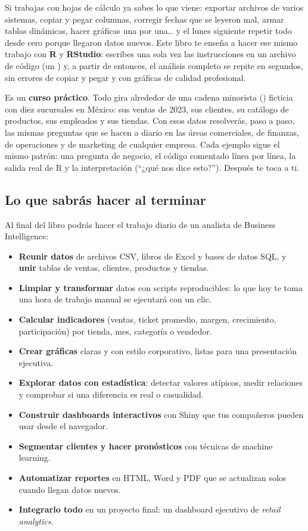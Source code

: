 Si trabajas con hojas de cálculo ya sabes lo que viene: exportar archivos de
varios sistemas, copiar y pegar columnas, corregir fechas que se leyeron mal,
armar tablas dinámicas, hacer gráficas una por una\ldots{} y el lunes
siguiente repetir todo desde cero porque llegaron datos nuevos. Este libro te
enseña a hacer ese mismo trabajo con \textbf{R} y \textbf{RStudio}: escribes
una sola vez las instrucciones en un archivo de código (un )
y, a partir de entonces, el análisis completo se repite en segundos, sin
errores de copiar y pegar y con gráficas de calidad profesional.

Es un \textbf{curso práctico}. Todo gira alrededor de una cadena minorista
() ficticia con diez sucursales en México: sus ventas de
2023, sus clientes, su catálogo de productos, sus empleados y sus tiendas.
Con esos datos resolverás, paso a paso, las mismas preguntas que se hacen a
diario en las áreas comerciales, de finanzas, de operaciones y de marketing
de cualquier empresa. Cada ejemplo sigue el mismo patrón: una pregunta de
negocio, el código comentado línea por línea, la salida real de R y la
interpretación (``¿qué nos dice esto?''). Después te toca a ti.

\subsection{Lo que sabrás hacer al terminar}

Al final del libro podrás hacer el trabajo diario de un analista de
Business Intelligence:

\begin{itemize}
  \item \textbf{Reunir datos} de archivos CSV, libros de Excel y bases de
        datos SQL, y \textbf{unir} tablas de ventas, clientes, productos y
        tiendas.
  \item \textbf{Limpiar y transformar} datos con scripts reproducibles: lo
        que hoy te toma una hora de trabajo manual se ejecutará con un clic.
  \item \textbf{Calcular indicadores} (ventas, ticket promedio, margen,
        crecimiento, participación) por tienda, mes, categoría o vendedor.
  \item \textbf{Crear gráficas} claras y con estilo corporativo, listas para
        una presentación ejecutiva.
  \item \textbf{Explorar datos con estadística}: detectar valores atípicos,
        medir relaciones y comprobar si una diferencia es real o casualidad.
  \item \textbf{Construir dashboards interactivos} con Shiny que tus
        compañeros pueden usar desde el navegador.
  \item \textbf{Segmentar clientes y hacer pronósticos} con técnicas de
        machine learning.
  \item \textbf{Automatizar reportes} en HTML, Word y PDF que se actualizan
        solos cuando llegan datos nuevos.
  \item \textbf{Integrarlo todo} en un proyecto final: un dashboard
        ejecutivo de \textit{retail analytics}.
\end{itemize}

